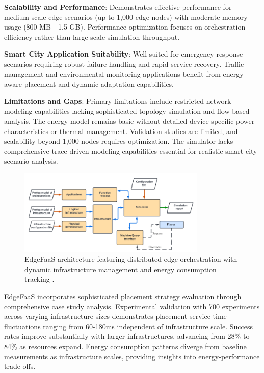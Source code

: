 \textbf{Scalability and Performance}: Demonstrates effective performance for medium-scale edge scenarios (up to 1,000 edge nodes) with moderate memory usage (800 MB - 1.5 GB). Performance optimization focuses on orchestration efficiency rather than large-scale simulation throughput.

\textbf{Smart City Application Suitability}: Well-suited for emergency response scenarios requiring robust failure handling and rapid service recovery. Traffic management and environmental monitoring applications benefit from energy-aware placement and dynamic adaptation capabilities.

\textbf{Limitations and Gaps}: Primary limitations include restricted network modeling capabilities lacking sophisticated topology simulation and flow-based analysis. The energy model remains basic without detailed device-specific power characteristics or thermal management. Validation studies are limited, and scalability beyond 1,000 nodes requires optimization. The simulator lacks comprehensive trace-driven modeling capabilities essential for realistic smart city scenario analysis.

\begin{figure}[htbp]
\centering
\includegraphics[width=0.8\textwidth]{assets/lambdacontsim.png}
\caption{EdgeFaaS architecture featuring distributed edge orchestration with dynamic infrastructure management and energy consumption tracking \cite{li2022edgefaas}.}
\label{fig:edgefaas-architecture}
\end{figure}


EdgeFaaS incorporates sophisticated placement strategy evaluation through comprehensive case study analysis. Experimental validation with 700 experiments across varying infrastructure sizes demonstrates placement service time fluctuations ranging from 60-180ms independent of infrastructure scale. Success rates improve substantially with larger infrastructures, advancing from 28\% to 84\% as resources expand. Energy consumption patterns diverge from baseline measurements as infrastructure scales, providing insights into energy-performance trade-offs.

